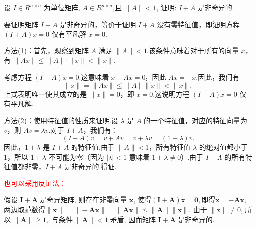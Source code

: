 \begin{tcolorbox}[enhanced,colback=10,colframe=9,breakable,coltitle=green!25!black,title=2024]
  
设 $ I \in R^{n \times n} $ 为单位矩阵, $A \in R^{n \times n} $,且 $ \|A\|<1 $, 证明: $ I+A $ 是非奇异的.
\tcblower

要证明矩阵 $I + A$ 是非奇异的，等价于证明 $I + A$ 没有零特征值，即证明方程 $(I + A)x = 0$ 仅有平凡解 $x = 0$.

方法(1)：首先，观察到矩阵 $A$ 满足 $\|A\| < 1$.该条件意味着对于所有的向量 $x$，有 $\|Ax\| \leq \|A\|\cdot \|x\| < \|x\|$.

考虑方程 $(I + A)x = 0$.这意味着 $x + Ax = 0$，因此 $Ax = -x$.因此，我们有
$$ \|x\| = \|Ax\| \leq \|A\| \|x\| < \|x\|, $$
上式表明唯一使其成立的是 $\|x\| = 0$，即 $x = 0$.这说明方程 $(I + A)x = 0$ 仅有平凡解.

方法(2)：使用特征值的性质来证明.设 $\lambda$ 是 $A$ 的一个特征值，对应的特征向量为 $v$，则 $Av = \lambda v$.对于 $I + A$，我们有：
$$(I + A)v = v + Av = v + \lambda v = (1 + \lambda) v.$$
因此，$1 + \lambda$ 是 $I + A$ 的特征值.由于 $\|A\| < 1$，所有特征值 $\lambda$ 的绝对值都小于 $1$，所以 $1 + \lambda$ 不可能为零（因为 $|\lambda| < 1$ 意味着 $1 + \lambda \neq 0$）.由于 $I + A$ 的所有特征值都非零，$I + A$ 是非奇异的.得证.

\begin{tcolorbox}
\textcolor{red}{也可以采用反证法：}

假设 $\boldsymbol{I}+\boldsymbol{A}$ 是奇异矩阵, 则存在非零向量 $ \boldsymbol{x} $, 使得$(\boldsymbol{I}+\boldsymbol{A}) \boldsymbol{x}=\boldsymbol{0},$即得$\boldsymbol{x}=-\boldsymbol{A x},$
两边取范数得$\|\boldsymbol{x}\|=\|-\boldsymbol{A} \boldsymbol{x}\| =\|\boldsymbol{A} \boldsymbol{x}\|\leqslant\|\boldsymbol{A}\|\|\boldsymbol{x}\| .$ 由于 $ \|\boldsymbol{x}\| \neq 0 $, 所以
$\|\boldsymbol{A}\| \geqslant 1,$ 与条件 $ \|\boldsymbol{A}\|<1 $ 矛盾, 因而矩阵 $ \boldsymbol{I}+\boldsymbol{A} $ 是非奇异的.
\end{tcolorbox}
\end{tcolorbox}

